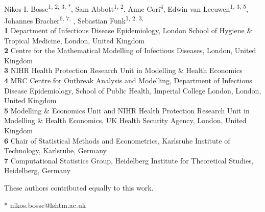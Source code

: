\documentclass[10pt,letterpaper]{article}
\begin{document}
\vspace*{0.2in}

\begin{flushleft}
{\Large
\textbf{} %
}
\newline
\\
Nikos I. Bosse\textsuperscript{1, 2, 3, *},
Sam Abbott\textsuperscript{1, 2},
Anne Cori\textsuperscript{4},
Edwin van Leeuwen\textsuperscript{1, 3, 5},
Johannes Bracher\textsuperscript{6, 7, \Yinyang},
Sebastian Funk\textsuperscript{1, 2, 3, \Yinyang}
\\
\bigskip
\textbf{1} Department of Infectious Disease Epidemiology, London School of Hygiene \& Tropical Medicine, London, United Kingdom
\\
\textbf{2} Centre for the Mathematical Modelling of Infectious Diseases, London, United Kingdom
\\
\textbf{3} NIHR Health Protection Research Unit in Modelling \& Health Economics
\\
\textbf{4} MRC Centre for Outbreak Analysis and Modelling, Department of Infectious Disease Epidemiology, School of Public Health, Imperial College London, London, United Kingdom
\\
\textbf{5} Modelling \& Economics Unit and NIHR Health Protection Research Unit in Modelling \& Health Economics, UK Health Security Agency, London, United Kingdom
\\
\textbf{6} Chair of Statistical Methods and Econometrics, Karlsruhe Institute of Technology, Karlsruhe, Germany
\\
\textbf{7} Computational Statistics Group, Heidelberg Institute for Theoretical Studies, Heidelberg, Germany
\\
\bigskip

% 
%
\Yinyang These authors contributed equally to this work.

* nikos.bosse@lshtm.ac.uk

\end{flushleft}
\end{document}
